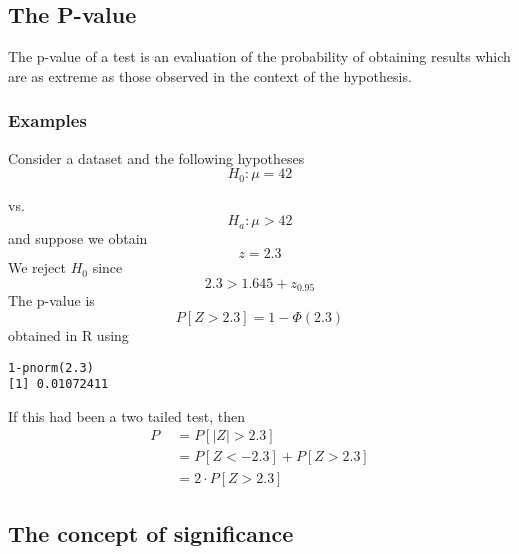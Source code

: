 \documentclass[12pt,a4paper]{article}
\theoremstyle{regla}
\theoremstyle{remark}
\theoremstyle{definition}
\theoremstyle{nonumberbreak}
\begin{document}
\subsection{The P-value}
\begin{fbox}
\begin{minipage}{0.97\textwidth}
The p-value of a test is an evaluation of the probability of obtaining results which are as extreme as those observed in the context of the hypothesis.
\end{minipage}
\end{fbox}
\subsubsection{Examples}
\begin{xmpl}
Consider a dataset and the following hypotheses \\
$$H_0:\mu=42$$

vs. $$H_a:\mu>42$$
and suppose we obtain\\
$$z=2.3$$
We reject $H_0$ since $$2.3>1.645+z_{0.95}$$
The p-value is
 $$P[Z>2.3]= 1-\Phi(2.3)$$
obtained in R using
\begin{lstlisting}
1-pnorm(2.3)
[1] 0.01072411
\end{lstlisting}

If this had been a two tailed test, then 
\begin{align*}
P &= P[|Z|>2.3]\\
\quad &=P[Z<-2.3]+P[Z>2.3]\\
\quad &=2\cdot P[Z>2.3]
\end{align*}
\end{xmpl}

\subsection{The concept of significance}
\end{document}
